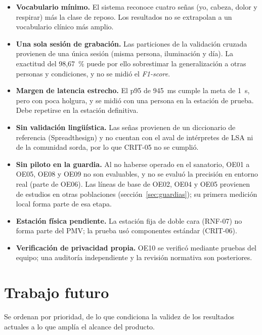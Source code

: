 \begin{itemize}
  \item \textbf{Vocabulario mínimo.} El sistema reconoce cuatro señas (yo, cabeza, dolor y respirar) más la clase de reposo. Los resultados no se extrapolan a un vocabulario clínico más amplio.
  \item \textbf{Una sola sesión de grabación.} Las particiones de la validación cruzada provienen de una única sesión (misma persona, iluminación y día). La exactitud del 98,67~\% puede por ello sobrestimar la generalización a otras personas y condiciones, y no se midió el \emph{F1-score}.
  \item \textbf{Margen de latencia estrecho.} El p95 de 945~ms cumple la meta de 1~s, pero con poca holgura, y se midió con una persona en la estación de prueba. Debe repetirse en la estación definitiva.
  \item \textbf{Sin validación lingüística.} Las señas provienen de un diccionario de referencia (Spreadthesign) y no cuentan con el aval de intérpretes de LSA ni de la comunidad sorda, por lo que CRIT-05 no se cumplió.
  \item \textbf{Sin piloto en la guardia.} Al no haberse operado en el sanatorio, OE01 a OE05, OE08 y OE09 no son evaluables, y no se evaluó la precisión en entorno real (parte de OE06). Las líneas de base de OE02, OE04 y OE05 provienen de estudios en otras poblaciones (sección~\ref{sec:guardias}); su primera medición local forma parte de esa etapa.
  \item \textbf{Estación física pendiente.} La estación fija de doble cara (RNF-07) no forma parte del PMV; la prueba usó componentes estándar (CRIT-06).
  \item \textbf{Verificación de privacidad propia.} OE10 se verificó mediante pruebas del equipo; una auditoría independiente y la revisión normativa son posteriores.
\end{itemize}

\section{Trabajo futuro}\label{sec:concl-futuro}

Se ordenan por prioridad, de lo que condiciona la validez de los resultados actuales a lo que amplía el alcance del producto.

